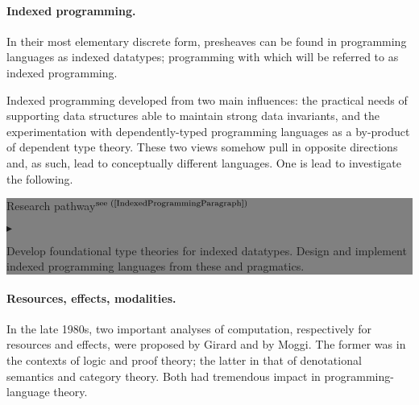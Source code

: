 \documentclass[11pt,twocolumn]{article}
\newenvironment{btritemize}
  {\begin{list}{\btr}
  {\setlength{\topsep}{2pt}
   \setlength{\partopsep}{2pt}
   \setlength{\itemsep}{2.5pt}
   \setlength{\parsep}{2.5pt}
   \setlength{\leftmargin}{1em}
   \setlength{\labelwidth}{.5em}}}
  {\end{list}}
\newcommand{\mytextsf}[1]{\textsf{\small #1}}
\newcommand{\hideMathematicalUniverses}[1]{#1}
\newcommand{\btr}{$\blacktriangleright$}
\newcommand{\reqpsize}{8.113395cm}%
\newcommand{\rep}[2]{\begin{center}\colorbox{grey}{\begin{minipage}{\reqpsize}
  \mytextsf{Research pathway}\hfill$^{\mbox{\scriptsize see #1 }}$\\[-5.5mm]
  \begin{btritemize}
  \item #2
  \end{btritemize}
\end{minipage}}\end{center}}
\begin{document}
\paragraph*{Indexed programming.}
\label{IndexedProgrammingIntro}

\hideMathematicalUniverses{
In their most elementary discrete form, presheaves can be found in programming
languages as indexed datatypes; programming with which will be %
referred to as indexed programming.  
}

Indexed programming developed from two main influences:
the practical needs of supporting data structures able to
maintain strong data invariants, 
and the experimentation with dependently-typed programming
languages %
as a by-product of dependent type theory.  These two views somehow pull in
opposite directions and, as such, lead to conceptually different
languages.  One is lead to investigate the following.
\rep{(\ref{IndexedProgrammingParagraph})} 
  {Develop foundational type theories for indexed datatypes.  
   Design and %
   implement indexed programming languages from these and
   pragmatics.}

\paragraph*{Resources, effects, modalities.}
\label{ResourcesEffectsModalitiesParagraph}

In the late 1980s, two important analyses of computation, respectively for
resources and effects, were proposed by Girard %
and by Moggi. %
The former was in the contexts of logic and proof theory; the latter in that
of denotational semantics and category theory.  Both %
had tremendous impact in programming-language theory.  
\end{document}
